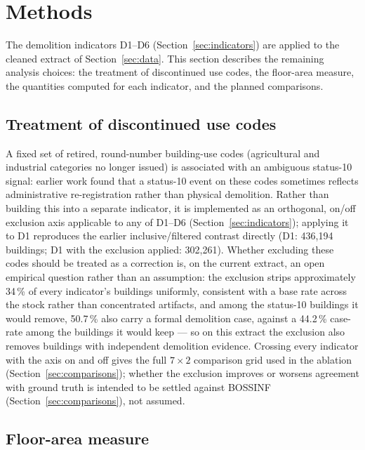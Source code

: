 \section{Methods}\label{sec:methods}

The demolition indicators D1--D6 (Section~\ref{sec:indicators}) are
applied to the cleaned extract of Section~\ref{sec:data}. This section
describes the remaining analysis choices: the treatment of discontinued
use codes, the floor-area measure, the quantities computed
for each indicator, and the planned comparisons.

\subsection{Treatment of discontinued use codes}\label{sec:discontinued-method}

A fixed set of retired, round-number building-use codes (agricultural
and industrial categories no longer issued) is associated with an
ambiguous status-10 signal: earlier work found that a status-10 event on
these codes sometimes reflects administrative re-registration rather
than physical demolition. Rather than building this into a separate
indicator, it is implemented as an orthogonal, on/off exclusion axis
applicable to any of D1--D6 (Section~\ref{sec:indicators}); applying it
to D1 reproduces the earlier inclusive/filtered contrast directly (D1:
436{,}194 buildings; D1 with the exclusion applied: 302{,}261). Whether
excluding these codes should be treated
as a correction is, on the current extract, an open empirical question
rather than an assumption: the exclusion strips approximately 34\,\% of
every indicator's buildings uniformly, consistent with a base rate
across the stock rather than concentrated artifacts, and among the
status-10 buildings it would remove, 50.7\,\% also carry a formal
demolition case, against a 44.2\,\% case-rate among the buildings it
would keep --- so on this extract the exclusion also removes buildings
with independent demolition evidence. Crossing every indicator with the
axis on and off gives the full $7\times2$ comparison grid used in the
ablation (Section~\ref{sec:comparisons}); whether the exclusion improves
or worsens agreement with ground truth is intended to be settled against
BOSSINF (Section~\ref{sec:comparisons}), not assumed.

\subsection{Floor-area measure}\label{sec:areas}

